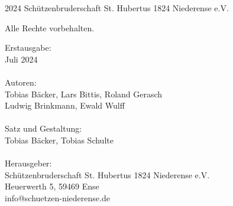 \begingroup
\footnotesize
\parindent 0pt
\parskip \baselineskip
\textcopyright{} 2024 Schützenbruderschaft St. Hubertus 1824 Niederense e.V.

Alle Rechte vorbehalten.

\lipsum[1-1]
\vfill
Erstausgabe:\\
\hspace*{2em} Juli 2024\\
\vspace*{0.4em}\\
Autoren:\\
\hspace*{2em} Tobias Bäcker, Lars Bittis, Roland Gerasch\\
\hspace*{2em} Ludwig Brinkmann, Ewald Wulff\\
\vspace*{0.4em}\\
Satz und Gestaltung:\\
\hspace*{2em} Tobias Bäcker, Tobias Schulte\\
\vspace*{0.4em}\\
Herausgeber:\\
\hspace*{2em} Schützenbruderschaft St. Hubertus 1824 Niederense e.V.\\
\hspace*{2em} Heuerwerth 5, 59469 Ense\\
\hspace*{2em} info@schuetzen-niederense.de
\endgroup
\clearpage